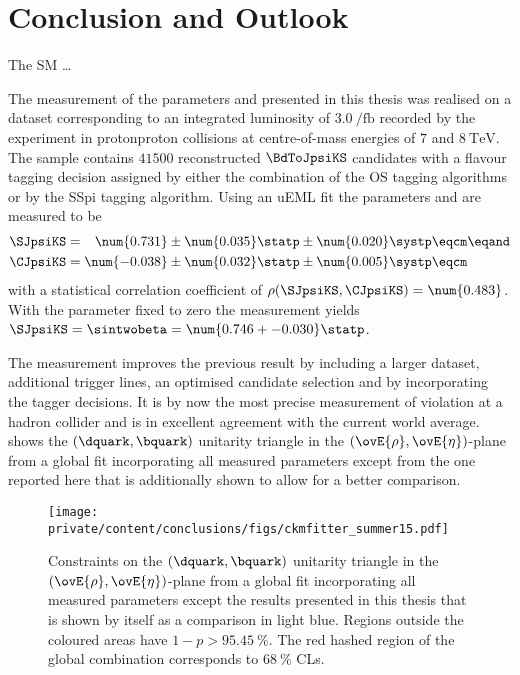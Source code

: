 
\chapter{Conclusion and Outlook}
\label{ch:conclusion}

The \acl{SM} \dots


The measurement of the \CP parameters \SJpsiKS and \CJpsiKS presented in this
thesis was realised on a dataset corresponding to an integrated luminosity of
$\SI{3.0}{\per\femto\barn}$ recorded by the \LHCb experiment in
\acl{protonproton} collisions at centre-of-mass energies of $\num{7}$ and
$\SI{8}{\TeV}$. The sample contains $\num{41500}$ reconstructed $\BdToJpsiKS$
candidates with a flavour tagging decision assigned by either the combination of
the \acl{OS} tagging algorithms or by the \acl{SSpi} tagging algorithm. Using an
\acl{uEML} fit the \CP parameters \SJpsiKS and \CJpsiKS are measured to be
%
\begin{equation*}
  \begin{split}
    \SJpsiKS &= \phantom{-}\num{0.731} \pm \num{0.035} \statp \pm \num{0.020} \systp \eqcm\eqand \\
    \CJpsiKS &=           \num{-0.038} \pm \num{0.032} \statp \pm \num{0.005} \systp \eqcm
  \end{split}
\end{equation*}
%
with a statistical correlation coefficient of $\rho(\SJpsiKS,\CJpsiKS) =
\num{0.483}$. With the parameter \CJpsiKS fixed to zero the measurement yields
$\SJpsiKS = \sintwobeta = \num{0.746 +- 0.030}\statp$.

The measurement improves the previous \LHCb result \cite{Aaij:1497268} by
including a larger dataset, additional trigger lines, an optimised candidate
selection and by incorporating the \SSpi tagger decisions. It is by now the most
precise measurement of \CP violation at a hadron collider and is in excellent
agreement with the current world average. 
shows the ${(\dquark,\bquark)}$ unitarity triangle in the
${(\ovE{\rho},\ovE{\eta})}$-plane from a global fit incorporating all measured
\CKM parameters \cite{Charles:2004jd} except from the one reported here that is
additionally shown to allow for a better comparison.
%
\begin{figure}[ht]
\centering
\texttt{[image: private/content/conclusions/figs/ckmfitter\_summer15.pdf]}
\caption{Constraints on the ${(\dquark,\bquark)}$ unitarity triangle in the
${(\ovE{\rho},\ovE{\eta})}$-plane from a global fit incorporating all measured
\CKM parameters \cite{Charles:2004jd} except the results presented in this
thesis that is shown by itself as a comparison in light blue. Regions outside
the coloured areas have $1-p > \SI{95.45}{\percent}$. The red hashed region of
the global combination corresponds to $\SI{68}{\percent}$ \acp{CL}.}
\label{fig:conclusion:ckm_fitter_15}
\end{figure}


